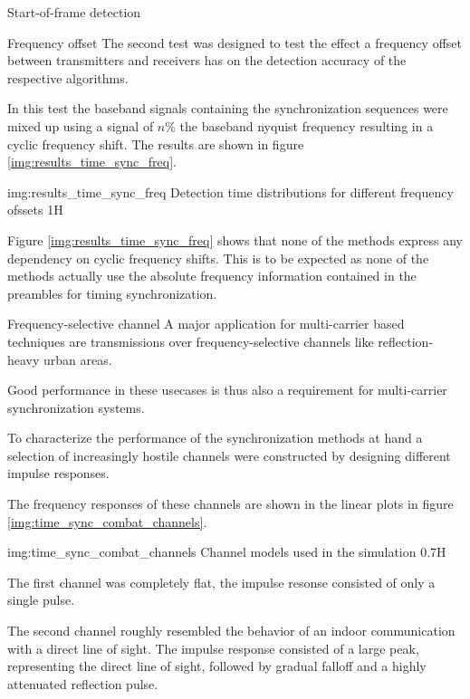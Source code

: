 \begin{subchapter}{Start-of-frame detection}
  \begin{subsubchapter}{Frequency offset}
    The second test was designed to test the effect a frequency offset
    between transmitters and receivers has on the detection accuracy
    of the respective algorithms.

    In this test the baseband signals containing the synchronization
    sequences were mixed up using a signal of $n\si{\percent}$ the
    baseband nyquist frequency resulting in a cyclic frequency shift.
    The results are shown in figure \ref{img:results_time_sync_freq}.

                 {img:results_time_sync_freq}
                 {Detection time distributions for different frequency ofssets}
                 {1}{H}

    Figure \ref{img:results_time_sync_freq} shows that none of the
    methods express any dependency on cyclic frequency shifts.
    This is to be expected as none of the methods actually use
    the absolute frequency information contained in the preambles
    for timing synchronization.
  \end{subsubchapter}

  \begin{subsubchapter}{Frequency-selective channel}
    A major application for multi-carrier based techniques
    are transmissions over frequency-selective channels
    like reflection-heavy urban areas.

    Good performance in these usecases is thus also a
    requirement for multi-carrier synchronization systems.

    To characterize the performance of the synchronization
    methods at hand a selection of increasingly hostile
    channels were constructed by designing different
    impulse responses.

    The frequency responses of these channels are shown
    in the linear plots in figure \ref{img:time_sync_combat_channels}.

                 {img:time_sync_combat_channels}
                 {Channel models used in the simulation}
                 {0.7}{H}

    The first channel was completely flat, the impulse resonse
    consisted of only a single pulse.

    The second channel roughly resembled the behavior of
    an indoor communication with a direct line of sight.
    The impulse response consisted of a large peak, representing the
    direct line of sight, followed by gradual falloff and a
    highly attenuated reflection pulse.


\end{subsubchapter}
\end{subchapter}
